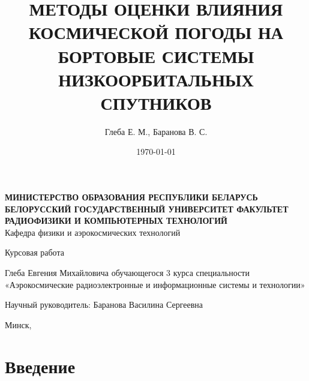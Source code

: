 \documentclass[14pt, a4paper]{extreport}
\title{МЕТОДЫ ОЦЕНКИ ВЛИЯНИЯ КОСМИЧЕСКОЙ ПОГОДЫ НА БОРТОВЫЕ СИСТЕМЫ НИЗКООРБИТАЛЬНЫХ СПУТНИКОВ}
\author{Глеба Е. М., Баранова В. С.}
\date{\today}
\begin{document}
    \setlength{\headheight}{14.0pt}

    \begin{titlepage}
        \begin{center}
            \textbf{МИНИСТЕРСТВО ОБРАЗОВАНИЯ РЕСПУБЛИКИ БЕЛАРУСЬ БЕЛОРУССКИЙ ГОСУДАРСТВЕННЫЙ УНИВЕРСИТЕТ ФАКУЛЬТЕТ РАДИОФИЗИКИ И КОМПЬЮТЕРНЫХ ТЕХНОЛОГИЙ
            } \\
            Кафедра физики и аэрокосмических технологий
        \end{center}

        \vspace{8em}

        \begin{center}
            \textbf{\thetitle}
        \end{center}
        
        \begin{center}
            {Курсовая работа}
        \end{center}

        \vspace{3cm}

        \hfill
        \parbox{17em}{
            Глеба Евгения Михайловича \newline
            обучающегося 3 курса специальности \newline
            «Аэрокосмические радиоэлектронные и информационные системы и технологии»

            \vspace{0.5cm}

            Научный руководитель: \newline
            Баранова Василина Сергеевна
        }

        \vspace{8cm}

        \begin{center}
            Минск, \the\year
        \end{center}

    \end{titlepage}

    \tableofcontents

    \newpage

    \section{Введение}
\end{document}
